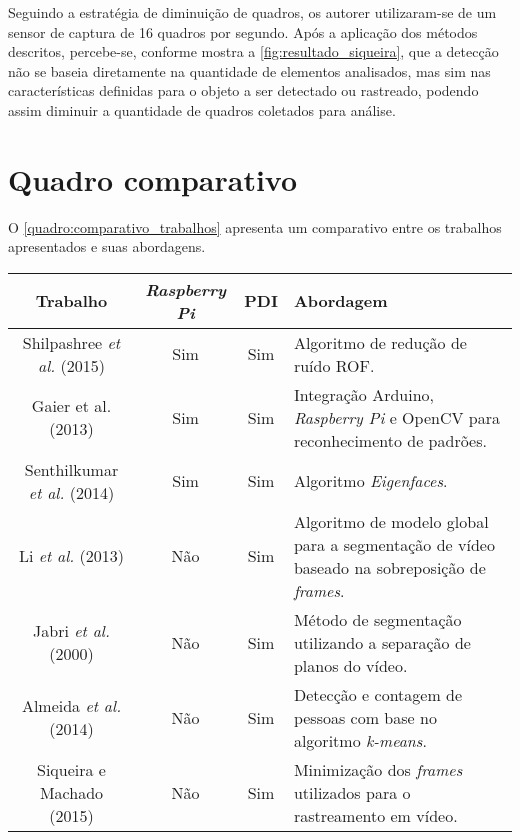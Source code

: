\documentclass[12pt,oneside,a4paper,chapter=TITLE,section=TITLE,sumario=tradicional]{abntex2}
\begin{document}
\begin{figure}[htb]
\end{figure}

Seguindo a estratégia de diminuição de quadros, os autorer utilizaram-se de um sensor de captura de 16 quadros por segundo. Após a aplicação dos métodos descritos, percebe-se, conforme mostra a \autoref{fig:resultado_siqueira}, que a detecção não se baseia diretamente na quantidade de elementos analisados, mas sim nas características definidas para o objeto a ser detectado ou rastreado, podendo assim diminuir a quantidade de quadros coletados para análise.

\begin{figure}[htb]
\end{figure}
\newpage

\section{Quadro comparativo}

O \autoref{quadro:comparativo_trabalhos} apresenta um comparativo entre os trabalhos apresentados e suas abordagens.

\begin{quadro}[htb]
    \begin{tabular}{|c||c|c| p{4.5cm}|}
        \hline
        \textbf{Trabalho} & \textbf{\textit{Raspberry Pi}} & \textbf{PDI} &   \textbf{Abordagem} \\ 
        \hline\hline
        Shilpashree \textit{et al.} (2015) & Sim    & Sim   & Algoritmo de redução de ruído ROF.   \\ \hline
        Gaier et al. (2013)  & Sim    & Sim   & Integração Arduino, \textit{Raspberry Pi} e OpenCV para reconhecimento de padrões.    \\ \hline
        Senthilkumar \textit{et al.} (2014)   & Sim   & Sim  & Algoritmo \textit{Eigenfaces}.    \\ \hline
        Li \textit{et al.} (2013)  & Não    & Sim  & Algoritmo de modelo global para a segmentação de vídeo  baseado na sobreposição de \textit{frames}.   \\ \hline
        Jabri \textit{et al.} (2000)  & Não    & Sim   & Método de segmentação utilizando a separação de planos do vídeo.    \\ \hline
        Almeida \textit{et al.} (2014)  & Não    & Sim   & Detecção e contagem de pessoas com base no algoritmo \textit{k-means}.    \\ \hline
        Siqueira e Machado (2015) & Não   & Sim  & Minimização dos \textit{frames} utilizados para o rastreamento em vídeo.    \\ \hline
    \end{tabular}
    \fonteautor
\end{quadro}
\end{document}

